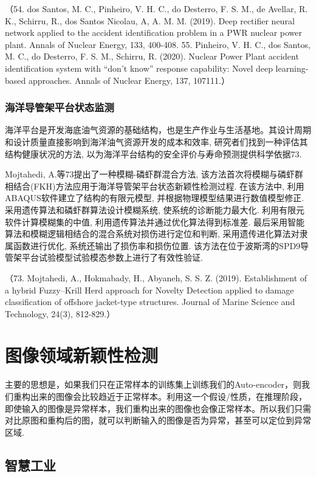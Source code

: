 \documentclass{Style/aas}
\begin{document}
\begin{multicols}{2}
  （54.	dos Santos, M. C., Pinheiro, V. H. C., do Desterro, F. S. M., de Avellar, R. K., Schirru, R., dos Santos Nicolau, A, A. M. M. (2019). Deep rectifier neural network applied to the accident identification problem in a PWR nuclear power plant. Annals of Nuclear Energy, 133, 400-408.
  55.	Pinheiro, V. H. C., dos Santos, M. C., do Desterro, F. S. M., Schirru, R. (2020). Nuclear Power Plant accident identification system with “don’t know” response capability: Novel deep learning-based approaches. Annals of Nuclear Energy, 137, 107111.）


  \subsubsection{海洋导管架平台状态监测}
  海洋平台是开发海底油气资源的基础结构，也是生产作业与生活基地。其设计周期和设计质量直接影响到海洋油气资源开发的成本和效率, 研究者们找到一种评估其结构健康状况的方法, 以为海洋平台结构的安全评价与寿命预测提供科学依据73.

  Mojtahedi, A.等73提出了一种模糊-磷虾群混合方法, 该方法首次将模糊与磷虾群相结合(FKH)方法应用于海洋导管架平台状态新颖性检测过程. 在该方法中, 利用ABAQUS软件建立了结构的有限元模型, 并根据物理模型结果进行数值模型修正.采用遗传算法和磷虾群算法设计模糊系统, 使系统的诊断能力最大化. 利用有限元软件计算模糊集的中值, 利用遗传算法并通过优化算法得到标准差. 最后采用智能算法和模糊逻辑相结合的混合系统对损伤进行定位和判断, 采用遗传进化算法对隶属函数进行优化, 系统还输出了损伤率和损伤位置. 该方法在位于波斯湾的SPD9导管架平台试验模型试验模态参数上进行了有效性验证.

  （73.	Mojtahedi, A., Hokmabady, H., Abyaneh, S. S. Z. (2019). Establishment of a hybrid Fuzzy–Krill Herd approach for Novelty Detection applied to damage classification of offshore jacket-type structures. Journal of Marine Science and Technology, 24(3), 812-829.）

  \section{图像领域新颖性检测}
  主要的思想是，如果我们只在正常样本的训练集上训练我们的Auto-encoder，则我们重构出来的图像会比较趋近于正常样本。利用这一个假设/性质，在推理阶段，即使输入的图像是异常样本，我们重构出来的图像也会像正常样本。所以我们只需对比原图和重构后的图，就可以判断输入的图像是否为异常，甚至可以定位到异常区域.

  \subsection{智慧工业}

\end{multicols}
\end{document}
